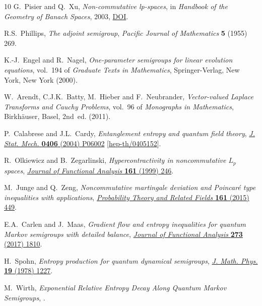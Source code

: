\documentclass[11pt,a4paper]{article}
\theoremstyle{plain}
\numberwithin{theorem}{section}
\theoremstyle{definition}
\newcommand{\?}{\overset{?}{=}}
\begin{document}
\begin{thebibliography}{10}
G.~Pisier and Q.~Xu, \emph{Non-commutative lp-spaces},  in \emph{Handbook of
  the Geometry of Banach Spaces}, 2003,
  \href{https://doi.org/10.1016/S1874-5849(03)80041-4}{DOI}.

R.S.~Phillips, \emph{The adjoint semigroup}, {\emph{Pacific Journal of
  Mathematics} {\bfseries 5} (1955) 269}.

K.-J.~Engel and R.~Nagel, \emph{One-parameter semigroups for linear evolution
  equations}, vol.~194 of \emph{Graduate Texts in Mathematics},
  Springer-Verlag, New York, New York (2000).

W.~Arendt, C.J.K.~Batty, M.~Hieber and F.~Neubrander, \emph{Vector-valued
  {L}aplace Transforms and {C}auchy Problems}, vol.~96 of \emph{Monographs in
  Mathematics}, Birkh{\"a}user, Basel, 2nd~ed. (2011).

P.~Calabrese and J.L.~Cardy, \emph{{Entanglement entropy and quantum field
  theory}}, \href{https://doi.org/10.1088/1742-5468/2004/06/P06002}{\emph{J.
  Stat. Mech.} {\bfseries 0406} (2004) P06002}
  [\href{https://arxiv.org/abs/hep-th/0405152}{{\ttfamily hep-th/0405152}}].

R.~Olkiewicz and B.~Zegarlinski, \emph{Hypercontractivity in noncommutative
  {$L_p$} spaces}, \href{https://doi.org/10.1006/jfan.1998.3342}{\emph{Journal
  of Functional Analysis} {\bfseries 161} (1999) 246}.

M.~Junge and Q.~Zeng, \emph{Noncommutative martingale deviation and
  {Poincar\'e} type inequalities with applications},
  \href{https://doi.org/10.1007/s00440-014-0552-1}{\emph{Probability Theory and
  Related Fields} {\bfseries 161} (2015) 449}.

E.A.~Carlen and J.~Maas, \emph{Gradient flow and entropy inequalities for
  quantum {M}arkov semigroups with detailed balance},
  \href{https://doi.org/10.1016/j.jfa.2017.05.003}{\emph{Journal of Functional
  Analysis} {\bfseries 273} (2017) 1810}.

H.~Spohn, \emph{{Entropy production for quantum dynamical semigroups}},
  \href{https://doi.org/10.1063/1.523789}{\emph{J. Math. Phys.} {\bfseries 19}
  (1978) 1227}.

M.~Wirth, \emph{{Exponential Relative Entropy Decay Along Quantum Markov
  Semigroups}},  \href{https://arxiv.org/abs/2505.07549}{{}}.


\end{thebibliography}
\end{document}
